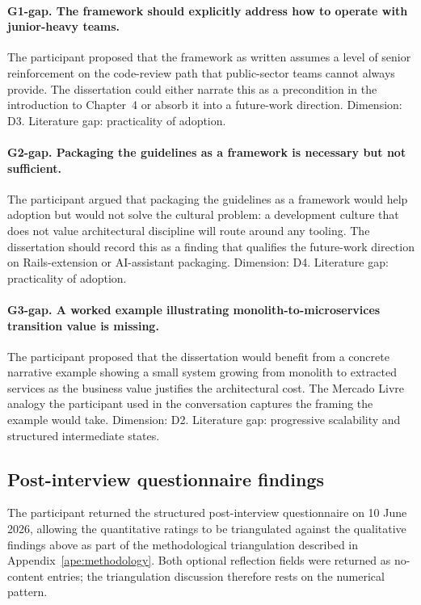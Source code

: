 \paragraph*{G1-gap. The framework should explicitly address how to operate with junior-heavy teams.} The participant proposed that the framework as written assumes a level of senior reinforcement on the code-review path that public-sector teams cannot always provide. The dissertation could either narrate this as a precondition in the introduction to Chapter~4 or absorb it into a future-work direction. Dimension: D3. Literature gap: practicality of adoption.

\paragraph*{G2-gap. Packaging the guidelines as a framework is necessary but not sufficient.} The participant argued that packaging the guidelines as a framework would help adoption but would not solve the cultural problem: a development culture that does not value architectural discipline will route around any tooling. The dissertation should record this as a finding that qualifies the future-work direction on Rails-extension or AI-assistant packaging. Dimension: D4. Literature gap: practicality of adoption.

\paragraph*{G3-gap. A worked example illustrating monolith-to-microservices transition value is missing.} The participant proposed that the dissertation would benefit from a concrete narrative example showing a small system growing from monolith to extracted services as the business value justifies the architectural cost. The Mercado Livre analogy the participant used in the conversation captures the framing the example would take. Dimension: D2. Literature gap: progressive scalability and structured intermediate states.

\subsection*{Post-interview questionnaire findings}

The participant returned the structured post-interview questionnaire on 10 June 2026, allowing the quantitative ratings to be triangulated against the qualitative findings above as part of the methodological triangulation described in Appendix~\ref{ape:methodology}. Both optional reflection fields were returned as no-content entries; the triangulation discussion therefore rests on the numerical pattern.

